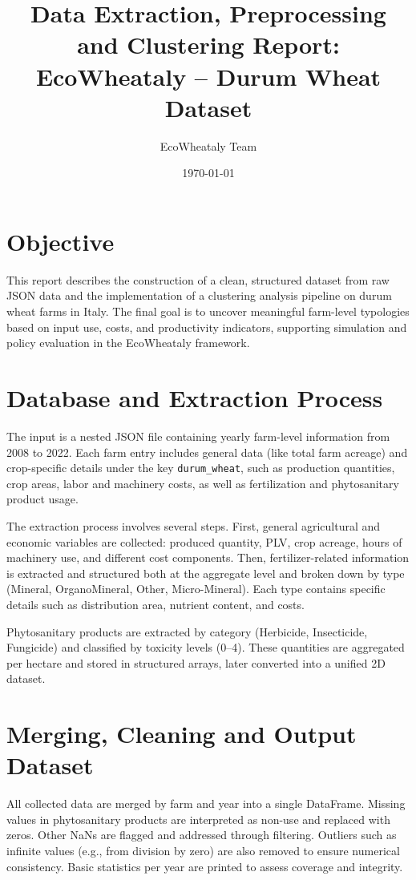 \documentclass[a4paper,12pt]{article}
\title{Data Extraction, Preprocessing and Clustering Report:\\ EcoWheataly – Durum Wheat Dataset}
\author{EcoWheataly Team}
\date{\today}
\begin{document}
\maketitle

\section{Objective}

This report describes the construction of a clean, structured dataset from raw JSON data and the implementation of a clustering analysis pipeline on durum wheat farms in Italy. The final goal is to uncover meaningful farm-level typologies based on input use, costs, and productivity indicators, supporting simulation and policy evaluation in the EcoWheataly framework.

\section{Database and Extraction Process}

The input is a nested JSON file containing yearly farm-level information from 2008 to 2022. Each farm entry includes general data (like total farm acreage) and crop-specific details under the key \texttt{durum\_wheat}, such as production quantities, crop areas, labor and machinery costs, as well as fertilization and phytosanitary product usage.

The extraction process involves several steps. First, general agricultural and economic variables are collected: produced quantity, PLV, crop acreage, hours of machinery use, and different cost components. Then, fertilizer-related information is extracted and structured both at the aggregate level and broken down by type (Mineral, OrganoMineral, Other, Micro-Mineral). Each type contains specific details such as distribution area, nutrient content, and costs.

Phytosanitary products are extracted by category (Herbicide, Insecticide, Fungicide) and classified by toxicity levels (0–4). These quantities are aggregated per hectare and stored in structured arrays, later converted into a unified 2D dataset.

\section{Merging, Cleaning and Output Dataset}

All collected data are merged by farm and year into a single DataFrame. Missing values in phytosanitary products are interpreted as non-use and replaced with zeros. Other NaNs are flagged and addressed through filtering. Outliers such as infinite values (e.g., from division by zero) are also removed to ensure numerical consistency. Basic statistics per year are printed to assess coverage and integrity.
\end{document}
